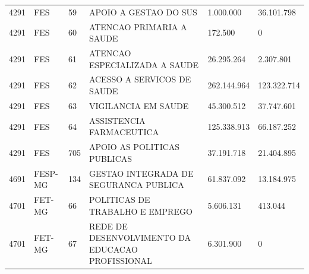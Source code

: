 \documentclass{article}
\begin{document}
\begin{longtable}[c]{m{1cm}|m{1.5cm}|m{1cm}m{8cm}|m{2cm}m{2cm}}
\multicolumn{1}{C{1cm}|}{4291} & \multicolumn{1}{L{1.5cm}|}{FES} & \multicolumn{1}{C{1cm}|}{59} & \multicolumn{1}{L{8cm}|}{APOIO A GESTAO DO SUS} & \multicolumn{1}{R{2cm}|}{1.000.000} & \multicolumn{1}{R{2cm}}{36.101.798} \\
\multicolumn{1}{C{1cm}|}{4291} & \multicolumn{1}{L{1.5cm}|}{FES} & \multicolumn{1}{C{1cm}|}{60} & \multicolumn{1}{L{8cm}|}{ATENCAO PRIMARIA A SAUDE} & \multicolumn{1}{R{2cm}|}{172.500} & \multicolumn{1}{R{2cm}}{            0} \\
\multicolumn{1}{C{1cm}|}{4291} & \multicolumn{1}{L{1.5cm}|}{FES} & \multicolumn{1}{C{1cm}|}{61} & \multicolumn{1}{L{8cm}|}{ATENCAO ESPECIALIZADA A SAUDE} & \multicolumn{1}{R{2cm}|}{26.295.264} & \multicolumn{1}{R{2cm}}{2.307.801} \\
\multicolumn{1}{C{1cm}|}{4291} & \multicolumn{1}{L{1.5cm}|}{FES} & \multicolumn{1}{C{1cm}|}{62} & \multicolumn{1}{L{8cm}|}{ACESSO A SERVICOS DE SAUDE} & \multicolumn{1}{R{2cm}|}{262.144.964} & \multicolumn{1}{R{2cm}}{123.322.714} \\
\multicolumn{1}{C{1cm}|}{4291} & \multicolumn{1}{L{1.5cm}|}{FES} & \multicolumn{1}{C{1cm}|}{63} & \multicolumn{1}{L{8cm}|}{VIGILANCIA EM SAUDE} & \multicolumn{1}{R{2cm}|}{45.300.512} & \multicolumn{1}{R{2cm}}{37.747.601} \\
\multicolumn{1}{C{1cm}|}{4291} & \multicolumn{1}{L{1.5cm}|}{FES} & \multicolumn{1}{C{1cm}|}{64} & \multicolumn{1}{L{8cm}|}{ASSISTENCIA FARMACEUTICA} & \multicolumn{1}{R{2cm}|}{125.338.913} & \multicolumn{1}{R{2cm}}{66.187.252} \\
\multicolumn{1}{C{1cm}|}{4291} & \multicolumn{1}{L{1.5cm}|}{FES} & \multicolumn{1}{C{1cm}|}{705} & \multicolumn{1}{L{8cm}|}{APOIO AS POLITICAS PUBLICAS} & \multicolumn{1}{R{2cm}|}{37.191.718} & \multicolumn{1}{R{2cm}}{21.404.895} \\
\multicolumn{1}{C{1cm}|}{4691} & \multicolumn{1}{L{1.5cm}|}{FESP-MG} & \multicolumn{1}{C{1cm}|}{134} & \multicolumn{1}{L{8cm}|}{GESTAO INTEGRADA DE SEGURANCA PUBLICA} & \multicolumn{1}{R{2cm}|}{61.837.092} & \multicolumn{1}{R{2cm}}{13.184.975} \\
\multicolumn{1}{C{1cm}|}{4701} & \multicolumn{1}{L{1.5cm}|}{FET-MG} & \multicolumn{1}{C{1cm}|}{66} & \multicolumn{1}{L{8cm}|}{POLITICAS DE TRABALHO E EMPREGO} & \multicolumn{1}{R{2cm}|}{5.606.131} & \multicolumn{1}{R{2cm}}{413.044} \\
\multicolumn{1}{C{1cm}|}{4701} & \multicolumn{1}{L{1.5cm}|}{FET-MG} & \multicolumn{1}{C{1cm}|}{67} & \multicolumn{1}{L{8cm}|}{REDE DE DESENVOLVIMENTO DA EDUCACAO PROFISSIONAL} & \multicolumn{1}{R{2cm}|}{6.301.900} & \multicolumn{1}{R{2cm}}{            0} \\

\end{longtable}
\end{document}
